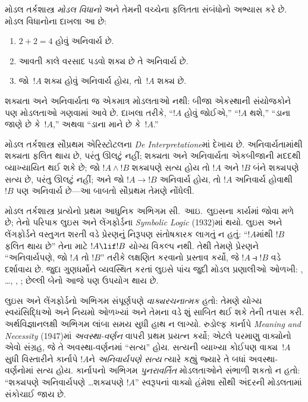 \documentclass[../../../include/open-logic-section]{subfiles}
\begin{document}


મોડલ તર્કશાસ્ત્ર \emph{મોડલ વિધાનો} અને તેમની વચ્ચેના ફલિતતા
સંબંધોનો અભ્યાસ કરે છે. મોડલ વિધાનોના દાખલા આ છે:
\begin{enumerate}
\item $2+2=4$ હોવું અનિવાર્ય છે.
\item આવતી કાલે વરસાદ પડવો શક્ય છે તે અનિવાર્ય છે.
\item જો~$!A$ શક્ય હોવું અનિવાર્ય હોય, તો~$!A$
  શક્ય છે.
\end{enumerate}
શક્યતા અને અનિવાર્યતા જ એકમાત્ર મોડલતાઓ નથી:
બીજા એકસ્થાની સંયોજકોને પણ મોડલતાઓ ગણવામાં આવે છે.
દાખલા તરીકે, ``$!A$ હોવું જોઈએ,'' ``$!A$ થશે,''
``ડાના જાણે છે કે~$!A$,'' અથવા ``ડાના માને છે કે~$!A$.''

મોડલ તર્કશાસ્ત્ર સૌપ્રથમ એરિસ્ટોટલના \emph{De
  Interpretatione}માં દેખાય છે. અનિવાર્યતામાંથી શક્યતા
ફલિત થાય છે, પરંતુ ઊલટું નહીં; શક્યતા અને અનિવાર્યતા
એકબીજાની મદદથી વ્યાખ્યાયિત થઈ શકે છે; જો $!A \land !B$
શક્યપણે સત્ય હોય તો $!A$ અને $!B$ બંને શક્યપણે સત્ય છે,
પરંતુ ઊલટું નહીં; અને જો $!A \to !B$ અનિવાર્ય હોય,
તો $!A$ અનિવાર્ય હોવાથી~$!B$ પણ અનિવાર્ય છે---આ બાબતો
સૌપ્રથમ તેમણે નોંધેલી.

મોડલ તર્કશાસ્ત્ર પ્રત્યેનો પ્રથમ આધુનિક અભિગમ સી.~આઇ.~લુઇસના
કાર્યમાં જોવા મળે છે; તેનો પરિપાક લુઇસ અને લેંગફોર્ડના
\emph{Symbolic Logic} (1932)માં થયો. લુઇસ અને લેંગફોર્ડને
વસ્તુગત શરતી વડે પ્રેરણનું નિરૂપણ સંતોષકારક લાગતું ન હતું:
``$!A$માંથી $!B$ ફલિત થાય છે'' તેના માટે $!A \lif !B$
યોગ્ય વિકલ્પ નથી. તેથી તેમણે પ્રેરણને ``અનિવાર્યપણે,
જો $!A$ તો $!B$'' તરીકે લક્ષણિત કરવાનો પ્રસ્તાવ કર્યો,
જે $!A \strictif !B$ વડે દર્શાવાય છે. જુદા ગુણધર્મોને
વ્યવસ્થિત કરતાં લુઇસે પાંચ જુદી મોડલ પ્રણાલીઓ ઓળખી:
, \ldots, , ; છેલ્લી બેનો આજે પણ
ઉપયોગ થાય છે.

લુઇસ અને લેંગફોર્ડનો અભિગમ સંપૂર્ણપણે \emph{વાક્યરચનાત્મક}
હતો: તેમણે યોગ્ય સ્વયંસિદ્ધિઓ અને નિયમો ઓળખ્યાં અને
તેમના વડે શું સાબિત થઈ શકે તેની તપાસ કરી. અર્થવિજ્ઞાનલક્ષી
અભિગમ લાંબા સમય સુધી હાથ ન લાગ્યો. રુડોલ્ફ કાર્નાપે
\emph{Meaning and Necessity} (1947)માં \emph{અવસ્થા-વર્ણન}
વાપરી પ્રથમ પ્રયત્ન કર્યો; એટલે પરમાણુ વાક્યોનો એવો સંગ્રહ,
જે તે અવસ્થા-વર્ણનમાં ``સત્ય'' હોય. સત્યની વ્યાખ્યા કોઈપણ
વાક્ય~$!A$ સુધી વિસ્તારીને કાર્નાપે $!A$ને \emph{અનિવાર્યપણે
સત્ય} ત્યારે કહ્યું જ્યારે તે બધાં અવસ્થા-વર્ણનોમાં સત્ય હોય.
કાર્નાપનો અભિગમ \emph{પુનરાવર્તિત} મોડલતાઓને સંભાળી શકતો
ન હતો: ``શક્યપણે અનિવાર્યપણે \ldots શક્યપણે $!A$''
સ્વરૂપનાં વાક્યો હંમેશા સૌથી અંદરની મોડલતામાં સંકોચાઈ જાય છે.
\end{document}

